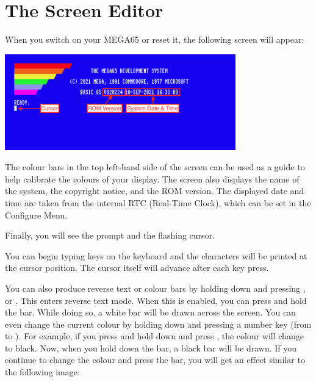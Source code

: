 \section{The Screen Editor}
\label{sec:screen-editor}

When you switch on your MEGA65 or reset it, the following screen will appear:

\begin{center}
\includegraphics[width={10cm}]{images/introduction-screen/layout.png}
\end{center}

The colour bars in the top left-hand side of the screen can be used
as a guide to help calibrate the colours of your display.
The screen also displays the name of the system,
the copyright notice, and the ROM version.
The displayed date and time are taken from the internal RTC
(Real-Time Clock), which can be set in the Configure Menu.

Finally, you will see the  prompt and the flashing cursor.

You can begin typing keys on the keyboard and the characters will be
printed at the cursor position. The cursor itself will advance after
each key press.

You can also produce reverse text or colour bars by holding down  and pressing , or . This enters reverse text mode. When this is enabled, you can press and hold the  bar. While doing so, a white bar will be drawn across the screen.
You can even change the current colour by holding  down and pressing a number key (from 
to ). For example, if you press and hold  down and press , the colour will
change to black. Now, when you hold down the  bar, a black bar will be drawn. If you continue to
change the colour and press the  bar, you will get an effect similar to the following image:


